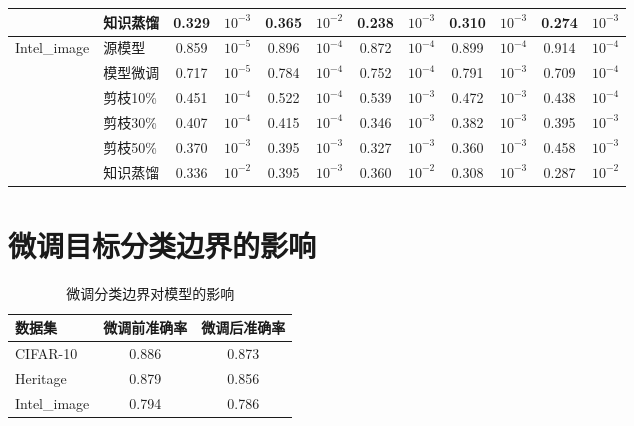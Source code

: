 \begin{table}[H]
{\begin{tabular}{l l c c c c c c c c c c}
								&知识蒸馏  & 0.329 & $10^{-3}$ & 0.365 & $10^{-2}$ & 0.238 & $10^{-3}$ & 0.310 & $10^{-3}$ & 0.274 & $10^{-3}$   \\
		\hline
\multirow{6}{5em}{Intel\_image} &源模型    & 0.859 & $10^{-5}$ & 0.896 & $10^{-4}$ & 0.872 & $10^{-4}$ & 0.899 & $10^{-4}$ & 0.914 & $10^{-4}$   \\
								&模型微调  & 0.717 & $10^{-5}$ & 0.784 & $10^{-4}$ & 0.752 & $10^{-4}$ & 0.791 & $10^{-3}$ & 0.709 & $10^{-4}$   \\
								&剪枝10\%  & 0.451 & $10^{-4}$ & 0.522 & $10^{-4}$ & 0.539 & $10^{-3}$ & 0.472 & $10^{-3}$ & 0.438 & $10^{-4}$   \\
								&剪枝30\%  & 0.407 & $10^{-4}$ & 0.415 & $10^{-4}$ & 0.346 & $10^{-3}$ & 0.382 & $10^{-3}$ & 0.395 & $10^{-3}$   \\
								&剪枝50\%  & 0.370 & $10^{-3}$ & 0.395 & $10^{-3}$ & 0.327 & $10^{-3}$ & 0.360 & $10^{-3}$ & 0.458 & $10^{-3}$   \\
								&知识蒸馏  & 0.336 & $10^{-2}$ & 0.395 & $10^{-3}$ & 0.360 & $10^{-2}$ & 0.308 & $10^{-3}$ & 0.287 & $10^{-2}$   \\
		\hline		
	\end{tabular}
}
\end{table}



\section{微调目标分类边界的影响}\label{5.5}

\begin{table}[H]
	\centering
	\setlength{\arrayrulewidth}{0.5mm}
	\renewcommand\arraystretch{1.8}
	\caption{微调分类边界对模型的影响}
	\label{table:state}
	\begin{tabular*}{13cm}{@{\extracolsep{\fill}} l c c}
		
	\hline
	数据集        &    微调前准确率   &   微调后准确率            \\
	\hline
	CIFAR-10      &     0.886        &     0.873               \\
	
	Heritage      &     0.879        &     0.856               \\
	
	Intel\_image  &     0.794        &     0.786               \\
	\hline		
	\end{tabular*}
\end{table}

